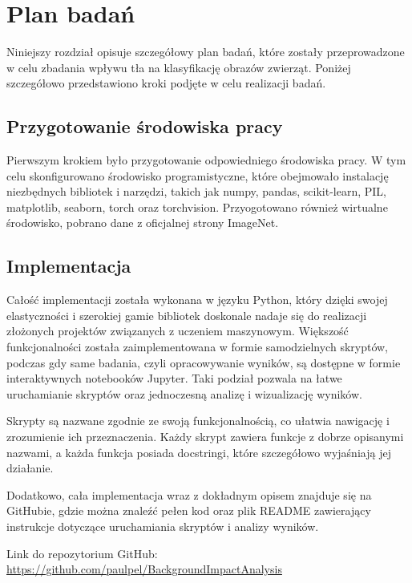 \section*{Plan badań}

Niniejszy rozdział opisuje szczegółowy plan badań, które zostały przeprowadzone w celu zbadania wpływu tła na klasyfikację obrazów zwierząt. Poniżej szczegółowo przedstawiono kroki podjęte w celu realizacji badań.

\subsection*{Przygotowanie środowiska pracy}

Pierwszym krokiem było przygotowanie odpowiedniego środowiska pracy. W tym celu skonfigurowano środowisko programistyczne, które obejmowało instalację niezbędnych bibliotek i narzędzi, takich jak numpy, pandas, scikit-learn, 
PIL, matplotlib, seaborn, torch oraz torchvision. Przyogotowano również wirtualne środowisko, pobrano dane z oficjalnej strony ImageNet. 

\subsection*{Implementacja}

Całość implementacji została wykonana w języku Python, który dzięki swojej elastyczności i szerokiej gamie bibliotek doskonale nadaje się do realizacji złożonych projektów związanych z uczeniem maszynowym. Większość funkcjonalności została 
zaimplementowana w formie samodzielnych skryptów, podczas gdy same badania, czyli opracowywanie wyników, są dostępne w formie interaktywnych notebooków Jupyter. Taki podział pozwala na łatwe uruchamianie skryptów oraz jednoczesną analizę i 
wizualizację wyników.

Skrypty są nazwane zgodnie ze swoją funkcjonalnością, co ułatwia nawigację i zrozumienie ich przeznaczenia. Każdy skrypt zawiera funkcje z dobrze opisanymi nazwami, a każda funkcja posiada docstringi, które szczegółowo wyjaśniają jej działanie.

Dodatkowo, cała implementacja wraz z dokładnym opisem znajduje się na GitHubie, gdzie można znaleźć pełen kod oraz plik README zawierający instrukcje dotyczące uruchamiania skryptów i analizy wyników. 

Link do repozytorium GitHub: \href{https://github.com/paulpel/BackgroundImpactAnalysis}{https://github.com/paulpel/BackgroundImpactAnalysis}

